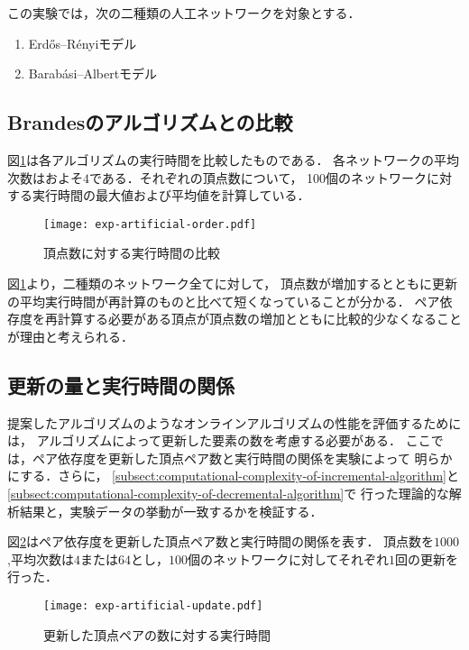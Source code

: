 この実験では，次の二種類の人工ネットワークを対象とする．
\begin{enumerate}
\item Erd\H{o}s--R\'{e}nyiモデル\cite{Erdos1959}
\item Barab\'{a}si--Albertモデル\cite{Barabasi1999}
\end{enumerate}

\subsection{Brandesのアルゴリズムとの比較}

図\ref{fig:exp-artificial-order}は各アルゴリズムの実行時間を比較したものである．
各ネットワークの平均次数はおよそ$4$である．それぞれの頂点数について，
100個のネットワークに対する実行時間の最大値および平均値を計算している．

\begin{figure}[tb]
  \centering
  \texttt{[image: exp-artificial-order.pdf]}
  \caption{頂点数に対する実行時間の比較}
  \label{fig:exp-artificial-order}
\end{figure}

図\ref{fig:exp-artificial-order}より，二種類のネットワーク全てに対して，
頂点数が増加するとともに更新の平均実行時間が再計算のものと比べて短くなっていることが分かる．
ペア依存度を再計算する必要がある頂点が頂点数の増加とともに比較的少なくなることが理由と考えられる．

\subsection{更新の量と実行時間の関係}

提案したアルゴリズムのようなオンラインアルゴリズムの性能を評価するためには，
アルゴリズムによって更新した要素の数を考慮する必要がある．
\cite{Ramalingam1996,Lee2012,Pontecorvi2014}
ここでは，ペア依存度を更新した頂点ペア数と実行時間の関係を実験によって
明らかにする．さらに，
\ref{subsect:computational-complexity-of-incremental-algorithm}と
\ref{subsect:computational-complexity-of-decremental-algorithm}で
行った理論的な解析結果と，実験データの挙動が一致するかを検証する．

図\ref{fig:exp-artificial-update}はペア依存度を更新した頂点ペア数と実行時間の関係を表す．
頂点数を$1000$,平均次数は$4$または$64$とし，$100$個のネットワークに対してそれぞれ$1$回の更新を行った．

\begin{figure}[tb]
  \centering
  \texttt{[image: exp-artificial-update.pdf]}
  \caption{更新した頂点ペアの数に対する実行時間}
  \label{fig:exp-artificial-update}
\end{figure}

